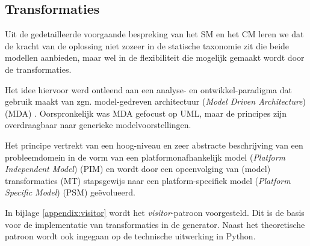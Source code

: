 
\subsection{Transformaties}
\label{subsection:devel-transformations}

Uit de gedetailleerde voorgaande bespreking van het SM en het CM leren we dat
de kracht van de oplossing niet zozeer in de statische taxonomie zit die beide
modellen aanbieden, maar wel in de flexibiliteit die mogelijk gemaakt wordt
door de transformaties.

Het idee hiervoor werd ontleend aan een analyse- en ontwikkel-paradigma dat
gebruik maakt van zgn. model-gedreven architectuur (\emph{Model Driven
Architecture}) (MDA) \citep{soley2000model,kleppe2003mda}. Oorspronkelijk was
MDA gefocust op UML, maar de principes zijn overdraagbaar naar generieke
modelvoorstellingen.

Het principe vertrekt van een hoog-niveau en zeer abstracte beschrijving van
een probleemdomein in de vorm van een platformonafhankelijk model
(\emph{Platform Independent Model}) (PIM) en wordt door een opeenvolging van
(model) transformaties (MT) stapsgewijs naar een platform-specifiek model
(\emph{Platform Specific Model}) (PSM) ge\"evolueerd.

In bijlage \ref{appendix:visitor} wordt het \emph{visitor}-patroon voorgesteld.
Dit is de basis voor de implementatie van transformaties in de generator. Naast
het theoretische patroon wordt ook ingegaan op de technische uitwerking in
Python.

